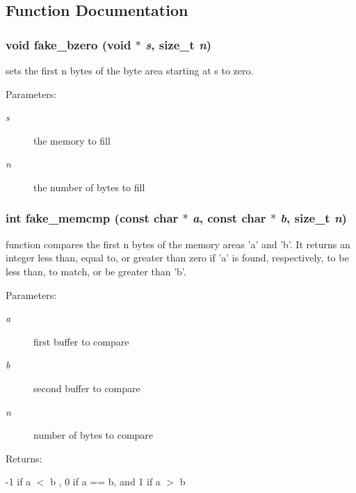 \subsection{Function Documentation}
\subsubsection{\setlength{\rightskip}{0pt plus 5cm}void fake\_\-bzero (void $\ast$ {\em s}, size\_\-t {\em n})}\label{group__fake__lib_a2}


sets the first n bytes of the byte area starting at s to zero.

\begin{Desc}
\item[Parameters: ]\par
\begin{description}
\item[{\em 
s}]the memory to fill \item[{\em 
n}]the number of bytes to fill \end{description}
\end{Desc}
\subsubsection{\setlength{\rightskip}{0pt plus 5cm}int fake\_\-memcmp (const char $\ast$ {\em a}, const char $\ast$ {\em b}, size\_\-t {\em n})}\label{group__fake__lib_a3}


function compares the first n bytes of the memory areas 'a' and 'b'. It returns an integer less than, equal to, or greater than zero if 'a' is found, respectively, to be less than, to match, or be greater than 'b'.

\begin{Desc}
\item[Parameters: ]\par
\begin{description}
\item[{\em 
a}]first buffer to compare \item[{\em 
b}]second buffer to compare \item[{\em 
n}]number of bytes to compare \end{description}
\end{Desc}
\begin{Desc}
\item[Returns: ]\par
-1 if a $<$ b , 0 if a == b, and 1 if a $>$ b \end{Desc}
